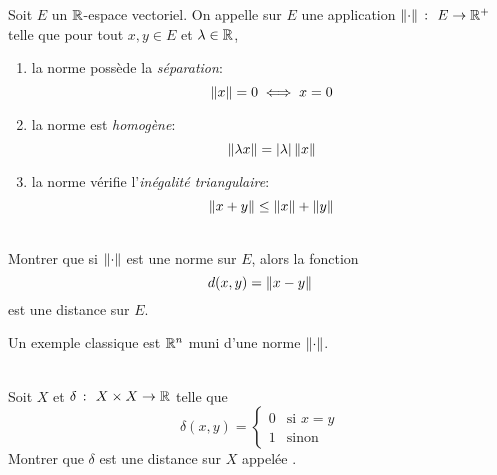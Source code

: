 \begin{definition}
    Soit \(E\) un \(\mathbb{R}\)-espace vectoriel.
    On appelle  sur \(E\) une application \(\mathopen{}\left\|\cdot\right\|\mathclose{}\ \colon\  E \to \mathbb{R}^+\) telle que
    pour tout \(x, y \in E\) et \(\lambda \in \mathbb{R}\),
    \begin{enumerate}[label=(\roman*)] %
        \item la norme possède la \emph{séparation}:
        \begin{equation*}
            \mathopen{}\left\|x\right\|\mathclose{} = 0 \iff x = 0
        \end{equation*}

        \item la norme est \emph{homogène}:
        \begin{equation*}
            \mathopen{}\left\|\lambda x\right\|\mathclose{} = \left\lvert\lambda\right\rvert \mathopen{}\left\|x\right\|\mathclose{}
        \end{equation*}

        \item la norme vérifie l'\emph{inégalité triangulaire}:
        \begin{equation*}
            \mathopen{}\left\|x + y\right\|\mathclose{} \leq \mathopen{}\left\|x\right\|\mathclose{} + \mathopen{}\left\|y\right\|\mathclose{}
        \end{equation*}
    \end{enumerate}
\end{definition}

\begin{exercice}[\(\star\)]\,\\
    Montrer que si \(\mathopen{}\left\|\cdot\right\|\mathclose{}\) est une norme sur \(E\), alors la fonction
    \begin{equation*}
        d(x, y) = \mathopen{}\left\|x - y\right\|\mathclose{}
    \end{equation*}
    est une distance sur \(E\).
\end{exercice}

\begin{example}
    Un exemple classique est \(\mathbb{R}^n\) muni d'une norme \(\mathopen{}\left\|\cdot\right\|\mathclose{}\).
\end{example}

\begin{exercice}[\(\star\)]\,\\
    Soit \(X\) et \(\delta\ \colon\  X \times X \to \mathbb{R}\) telle que
    \begin{equation*}
        \delta(x, y) = \begin{cases}
            0 & \text{si } x = y \\
            1 & \text{sinon}
        \end{cases}
    \end{equation*}
    Montrer que \(\delta\) est une distance sur \(X\) appelée .
\end{exercice}

